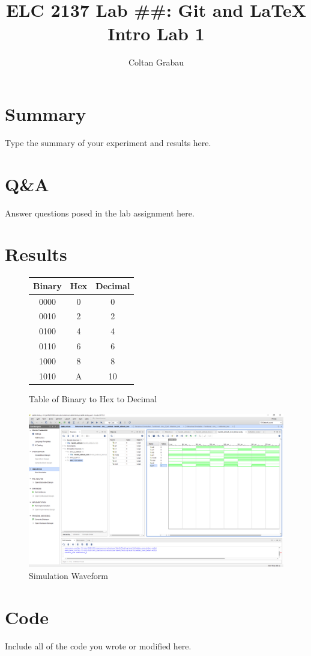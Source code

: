 \documentclass[11pt]{article}
\begin{document}
\title{ELC 2137 Lab \#\#: Git and LaTeX Intro Lab 1}
\author{Coltan Grabau}

\maketitle


\section*{Summary}

Type the summary of your experiment and results here.  


\section*{Q\&A}

Answer questions posed in the lab assignment here.


\section*{Results}
	\begin{figure}[ht]\centering
		\begin{center}
			\begin{tabular}{c|c|c}
				\toprule
				Binary & Hex & Decimal \\
				\midrule
				0000 & 0 & 0 \\
				0010 & 2 & 2 \\
				0100 & 4 & 4 \\
				0110 & 6 & 6 \\
				1000 & 8 & 8 \\
				1010 & A & 10 \\
				\bottomrule
			\end{tabular}
			\caption{Table of Binary to Hex to Decimal}
		\end{center}
	\end{figure}

	\begin{figure}[ht]\centering
		\includegraphics[width=1\textwidth,trim=18.5cm 15.5cm .5cm 4.5cm,clip]{lab1_example_screenshot}
		\caption{Simulation Waveform}
		\label{fig:Simulation}
	\end{figure}

\section*{Code}

Include all of the code you wrote or modified here.
\end{document}
